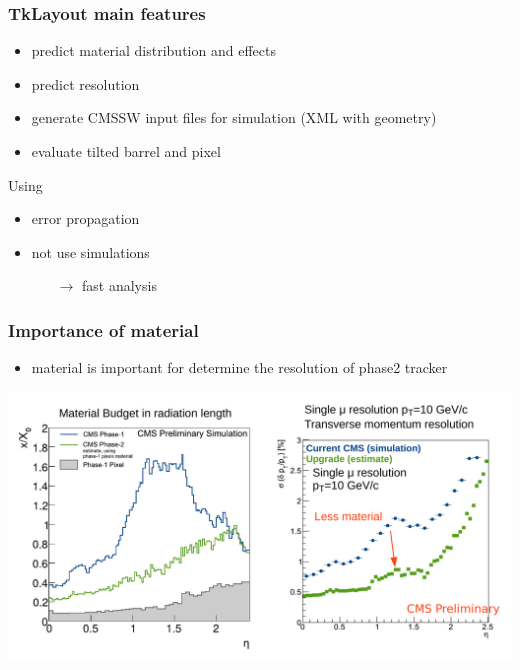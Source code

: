 \documentclass[pdftex, 11pt]{beamer}
\begin{document}
\begin{frame}
  \frametitle{TkLayout main features}
  \begin{itemize}
  \item predict \alert{material} distribution and effects
    \pause
  \item predict \alert{resolution}
    \pause
  \item generate \alert{CMSSW} input files for simulation (XML with geometry)
    \pause
  \item evaluate \alert{tilted} barrel and \alert{pixel}
  \end{itemize}
  \pause
  \begin{block}{Using}
    \begin{itemize}
    \item error \alert{propagation}
    \item \alert{not} use simulations
      \begin{itemize}
      \item[$\rightarrow$] \alert{fast} analysis
      \end{itemize}
    \end{itemize}
  \end{block}
\end{frame}

\begin{frame}
  \frametitle{Importance of material}
  \begin{itemize}
  \item material is important for determine the
    \alert{resolution} of phase2 tracker
  \end{itemize}
  \begin{center}
      \includegraphics[width=\textwidth]{img/trackMatRes.pdf}
  \end{center}
\end{frame}
\end{document}
